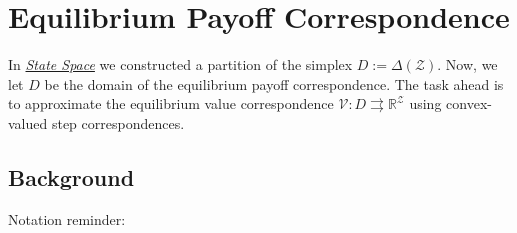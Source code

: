 \documentclass[a4paper,10pt,english]{sphinxmanual}
\begin{document}
\chapter{Equilibrium Payoff Correspondence}
\label{payoff_approximation:equilibrium-payoff-correspondence}\label{payoff_approximation::doc}
In {\hyperref[statespace::doc]{\emph{State Space}}} we constructed a partition of the simplex \(D:= \Delta(\mathcal{Z})\). Now, we let \(D\) be the domain of the equilibrium payoff correspondence.
The task ahead is to approximate the equilibrium value correspondence \(\mathcal{V}: D
\rightrightarrows \mathbb{R}^{\mathcal{Z}}\) using
convex-valued step correspondences.


\section{Background}
\label{payoff_approximation:background}
Notation reminder:
\end{document}
